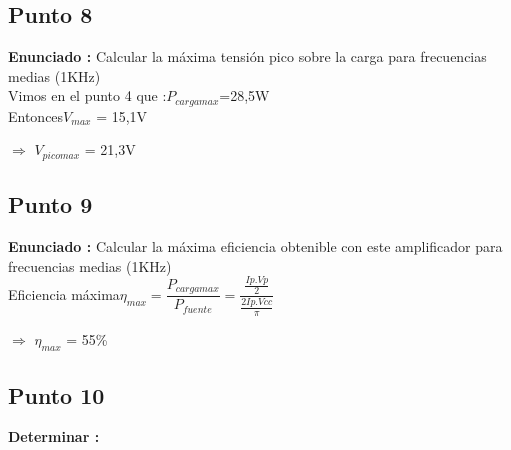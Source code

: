 \documentclass[12pt]{book}
\begin{document}
\subsection{Punto 8}
\textbf{Enunciado : } Calcular la máxima tensión pico sobre la carga para frecuencias medias (1KHz)\\[1cm]
Vimos en el punto 4 que :\quad $P_{cargamax}$=28,5W\\[0.25cm]
Entonces\quad $V_{max}$ = 15,1V
\begin{center}
$\Longrightarrow$  $V_{picomax}$ = 21,3V
\end{center}

\subsection{Punto 9}
\textbf{Enunciado : } Calcular la máxima eficiencia obtenible con este amplificador para frecuencias medias (1KHz)\\[1cm]
Eficiencia máxima\quad $\eta_{max}=\dfrac{P_{cargamax}}{P_{fuente}}=\dfrac{\frac{Ip.Vp}{2}}{\frac{2 Ip.Vcc}{\pi}}$
\begin{center}
$\Longrightarrow$  $\eta_{max}$ = 55\%
\end{center}

\subsection{Punto 10}
\textbf{Determinar : }\\
\end{document}
